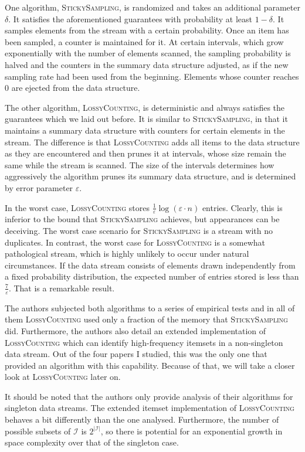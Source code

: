 \documentclass[landscape,twocolumn,a4paper]{article}
\begin{document}
One algorithm, \textsc{StickySampling}, is randomized and takes an additional parameter $\delta$. It satisfies the aforementioned guarantees with probability at least $1-\delta$. It samples elements from the stream with a certain probability. Once an item has been sampled, a counter is maintained for it. At certain intervals, which grow exponentially with the number of elements scanned, the sampling probability is halved and the counters in the summary data structure adjusted, as if the new sampling rate had been used from the beginning. Elements whose counter reaches 0 are ejected from the data structure.

The other algorithm, \textsc{LossyCounting}, is deterministic and always satisfies the guarantees which we laid out before. It is similar to \textsc{StickySampling}, in that it maintains a summary data structure with counters for certain elements in the stream. The difference is that \textsc{LossyCounting} adds all items to the data structure as they are encountered and then prunes it at intervals, whose size remain the same while the stream is scanned. The size of the intervals determines how aggressively the algorithm prunes its summary data structure, and is determined by error parameter $\varepsilon$. 

In the worst case, \textsc{LossyCounting} stores $\frac{1}{\varepsilon}\log (\varepsilon \cdot n)$ entries. Clearly, this is inferior to the bound that \textsc{StickySampling} achieves, but appearances can be deceiving. The worst case scenario for \textsc{StickySampling} is a stream with no duplicates. In contrast, the worst case for \textsc{LossyCounting} is a somewhat pathological stream, which is highly unlikely to occur under natural circumstances. If the data stream consists of elements drawn independently from a fixed probability distribution, the expected number of entries stored is less than $\frac{7}{\varepsilon}$. That is a remarkable result.

The authors subjected both algorithms to a series of empirical tests and in all of them \textsc{LossyCounting} used only a fraction of the memory that  \textsc{StickySampling} did. Furthermore, the authors also detail an extended implementation of \textsc{LossyCounting} which can identify high-frequency itemsets in a non-singleton data stream. Out of the four papers I studied, this was the only one that provided an algorithm with this capability. Because of that, we will take a closer look at \textsc{LossyCounting} later on.

It should be noted that the authors only provide analysis of their algorithms for singleton data streams. The extended itemset implementation of \textsc{LossyCounting} behaves a bit differently than the one analysed. Furthermore, the number of possible subsets of $\mathcal{I}$ is $2^{|\mathcal{I}|}$, so there is potential for an exponential growth in space complexity over that of the singleton case.
\end{document}
